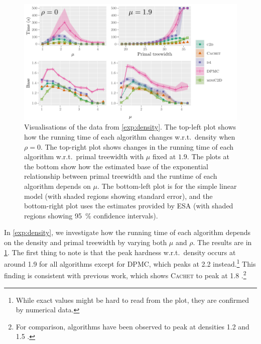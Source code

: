 \begin{figure}[t]
  \centering
  \includegraphics{chapters/comparison/treewidth}
  \caption[Visualisations of the data from \cref{exp:density}. The top-left plot
  shows how the running time of each algorithm changes w.r.t.\ density when
  $\rho = 0$. The top-right plot shows changes in the running time of each
  algorithm w.r.t.\ primal treewidth with $\mu$ fixed at $1.9$. The plots at the
  bottom show how the estimated base of the exponential relationship between
  primal treewidth and the runtime of each algorithm depends on $\mu$. The
  bottom-left plot is for the simple linear model (with shaded regions showing
  standard error), and the bottom-right plot uses the estimates provided by ESA
  (with shaded regions showing \SI{95}{\percent} confidence intervals).]%
  {Visualisations of the data from \cref{exp:density}. The top-left plot shows
    how the running time of each algorithm changes w.r.t.\ density when
    $\rho = 0$. The top-right plot shows changes in the running time of each
    algorithm w.r.t.\ primal treewidth with $\mu$ fixed at $1.9$. The plots at
    the bottom show how the estimated base of the exponential relationship
    between primal treewidth and the runtime of each algorithm depends on $\mu$.
    The bottom-left plot is for the simple linear model (with shaded regions
    showing standard error), and the bottom-right plot uses the estimates
    provided by ESA  (with shaded
    regions showing \SI{95}{\percent} confidence intervals).}\label{fig:treewidth}
\end{figure}

In \cref{exp:density}, we investigate how the running time of each algorithm
depends on the density and primal treewidth by varying both $\mu$ and $\rho$.
The results are in \cref{fig:treewidth}. The first thing to note is that the
peak hardness w.r.t.\ density occurs at around 1.9 for all algorithms except for
\textsc{DPMC}, which peaks at 2.2 instead.\footnote{While exact values might be
  hard to read from the plot, they are confirmed by numerical data.} This
finding is consistent with previous work, which shows \textsc{Cachet} to peak at
1.8 \citep{DBLP:conf/sat/SangBBKP04}.\footnote{For comparison, \mc{} algorithms
  have been observed to peak at densities 1.2 and 1.5
  \citep{DBLP:conf/aaai/Pehoushek00}.}

